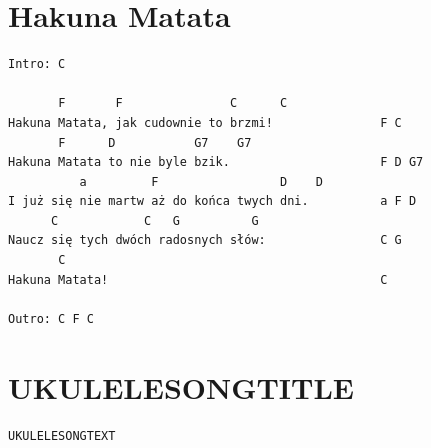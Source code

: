 \documentclass[twoside]{article}
\begin{document}

\section{Hakuna Matata}
\begin{verbatim}Intro: C

       F       F               C      C
Hakuna Matata, jak cudownie to brzmi!               F C
       F      D           G7    G7
Hakuna Matata to nie byle bzik.                     F D G7
          a         F                 D    D
I już się nie martw aż do końca twych dni.          a F D
      C            C   G          G
Naucz się tych dwóch radosnych słów:                C G
       C
Hakuna Matata!                                      C

Outro: C F C\end{verbatim}

\newpage

\section{UKULELESONGTITLE}
\begin{verbatim}UKULELESONGTEXT\end{verbatim}
\end{document}
